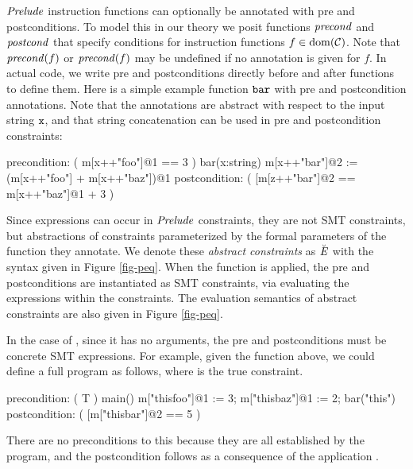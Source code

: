 $\mathit{Prelude}$ instruction functions can optionally be annotated with pre
and postconditions. To model this in our theory we posit functions
$\mathit{precond}$ and $\mathit{postcond}$ that specify conditions for instruction
functions $f \in \mathrm{dom}(\mathcal{C})$.  Note that $\mathit{precond}(f)$ or
$\mathit{precond}(f)$ may be undefined if no annotation is given for $f$. In
actual code, we write pre and postconditions directly before and after
functions to define them. Here is a simple example function
$\texttt{bar}$ with pre and postcondition annotations. Note that the
annotations are abstract with respect to the input string $\texttt{x}$,
and that string concatenation can be used in pre and postcondition
constraints:
\begin{verbatimtab}
precondition: ( m[x++"foo"]@1 == 3 )
bar(x:string){ m[x++"bar"]@2 := (m[x++"foo"] + m[x++"baz"])@1 }
postcondition: ( [m[z++"bar"]@2 == m[x++"baz"]@1 + 3 )
\end{verbatimtab}
Since expressions can occur in $\mathit{Prelude}$ constraints, they are not
SMT constraints, but abstractions of constraints parameterized by
the formal parameters of the function they annotate. We denote these
\emph{abstract constraints} as $\breve{\mathit{E}}$ with the syntax given
in Figure \ref{fig-peq}. When the function is applied, the pre and postconditions
are instantiated as SMT constraints, via evaluating the expressions
within the constraints. The evaluation semantics of abstract constraints
are also given in Figure \ref{fig-peq}.

\peqfig

In the case of , since it has no arguments, the
pre and postconditions must be concrete SMT expressions.
For example, given the  function above, we
could define a full program as follows, where 
is the true constraint. 
\begin{verbatimtab}
precondition: ( T )
main(){
  m["thisfoo"]@1 := 3; m["thisbaz"]@1 := 2; bar("this")
}
postcondition: ( [m["thisbar"]@2 == 5 )
\end{verbatimtab}
There are no preconditions to this  because they are
all established by the program, and the postcondition follows
as a consequence of the application .

